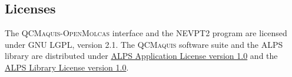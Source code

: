 \documentclass[bibliography=totoc,12pt,a4paper]{scrartcl}
\newcommand{\mol}{\textsc{OpenMolcas}}
\newcommand{\qcm}{\textsc{QCMaquis}}
\begin{document}
%
%

\subsection{Licenses}\label{sec:license}
The \qcm{}-\mol{} interface and the NEVPT2 program are licensed under GNU LGPL, version 2.1.
The \qcm{} software suite and the ALPS library are distributed under \href{http://alps.comp-phys.org/static/software/applications/LICENSE.txt}{ALPS Application License version 1.0} and the \href{http://alps.comp-phys.org/static/software/ALPS/LICENSE.txt}{ALPS Library License version 1.0}.
\clearpage
\newpage
\end{document}
